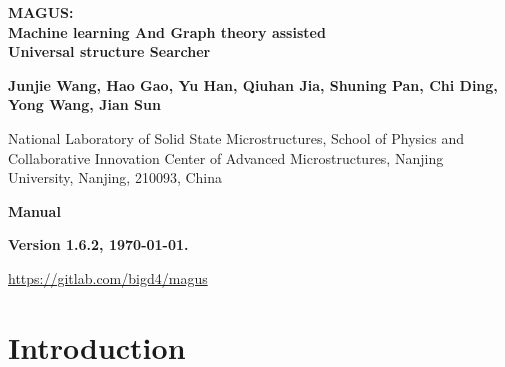 \documentclass[12pt,oneside]{book}
\begin{document}

\begin{titlepage}

\begin{center}

\vspace{2.0cm}

\textbf{ 
\Large MAGUS: \vspace{0.7cm} \\
Machine learning And Graph theory assisted \vspace{0.5cm} \\
Universal structure Searcher}
\vspace{1.5cm}

\textbf{Junjie Wang, Hao Gao, Yu Han, Qiuhan Jia, Shuning Pan, Chi Ding, Yong Wang, Jian Sun}

\vspace{0.5cm}

National Laboratory of Solid State Microstructures,
School of Physics and Collaborative Innovation Center of Advanced Microstructures, Nanjing University, Nanjing, 210093, China

\vspace{0.5cm}

\vspace{2.0cm}

\textbf{\Large Manual}

\textbf{Version 1.6.2, \today.}

\vspace{2.0cm}

\textcolor{blue}{\url{https://gitlab.com/bigd4/magus}}

\end{center}

\vspace{1.0cm}

\end{titlepage}


\newpage
\setcounter{tocdepth}{4}
\tableofcontents

\newpage
\chapter{Introduction}
\end{document}
